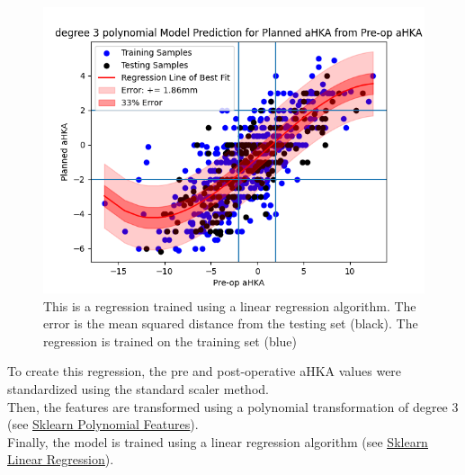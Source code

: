\documentclass{article}
\begin{document}
\begin{figure}[t]
	\includegraphics[width=\textwidth]{degree_3_polynomial_regression.png}
	\caption{This is a regression trained using a linear regression algorithm.
	The error is the mean squared distance from the testing set (black). 
	The regression is trained on the training set (blue)}
\end{figure}

To create this regression, the pre and post-operative aHKA values were standardized using the standard scaler method.\\
Then, the features are transformed using a polynomial transformation of degree 3 
(see \href{https://scikit-learn.org/stable/modules/generated/sklearn.linear_model.LinearRegression.html}{\underline{Sklearn Polynomial Features}}).\\
Finally, the model is trained using a linear regression algorithm 
(see \href{https://scikit-learn.org/stable/modules/generated/sklearn.linear_model.LinearRegression.html}{\underline{Sklearn Linear Regression}}).

\newpage
\end{document}

